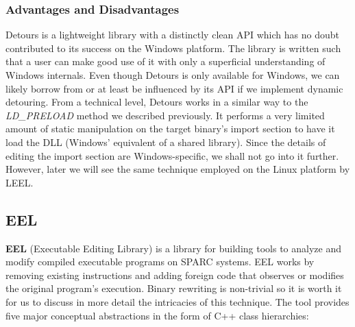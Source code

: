 \subsubsection{Advantages and Disadvantages}

Detours is a lightweight library with a distinctly clean API which has no doubt contributed to its success on the Windows platform. The library is written such that a user can make good use of it with only a superficial understanding of Windows internals. Even though Detours is only available for Windows, we can likely borrow from or at least be influenced by its API if we implement dynamic detouring. From a technical level, Detours works in a similar way to the \emph{LD\_PRELOAD} method we described previously. It performs a very limited amount of static manipulation on the target binary's import section to have it load the DLL (Windows' equivalent of a shared library). Since the details of editing the import section are Windows-specific, we shall not go into it further. However, later we will see the same technique employed on the Linux platform by LEEL.

\subsection{EEL}

\textbf{EEL} (Executable Editing Library) is a library for building tools to analyze and modify compiled executable programs on SPARC systems\cite{eel}. EEL works by removing existing instructions and adding foreign code that observes or modifies the original program's execution. Binary rewriting is non-trivial so it is worth it for us to discuss in more detail the intricacies of this technique. The tool provides five major conceptual abstractions in the form of C++ class hierarchies:

